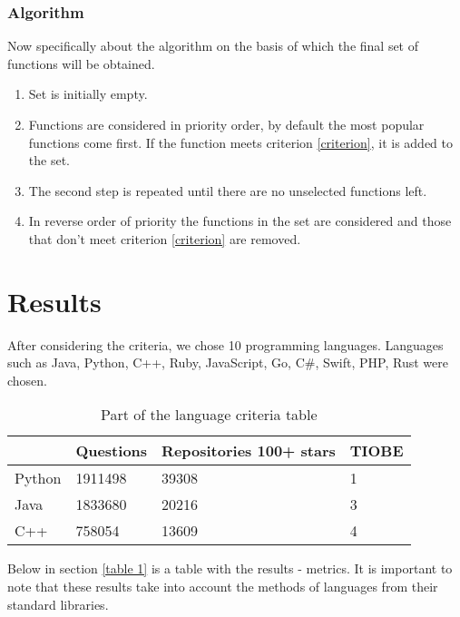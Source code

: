 \documentclass[anonymous,sigplan,review,11pt,nonacm,natbib=false]{acmart}
\begin{document}
    \subsubsection{Algorithm}

    Now specifically about the algorithm on the basis of which the final set of functions will be obtained.

    \begin{enumerate}
        \item Set is initially empty.
        \item Functions are considered in priority order, by default the most popular functions come first. If the function meets criterion \ref{criterion}, it is added to the set.
        \item The second step is repeated until there are no unselected functions left.
        \item In reverse order of priority the functions in the set are considered and those that don't meet criterion \ref{criterion} are removed.
    \end{enumerate}

    \section{Results}

    After considering the criteria, we chose 10 programming languages. Languages such as Java, Python, C++, Ruby, JavaScript, Go, C\#, Swift, PHP, Rust were chosen.


    \begin{table}[h]
        \begin{tabular}{llll}
            \hline
            & Questions
            & Repositories 100+ stars
            & TIOBE
            \\ \hline

            Python & 1911498 & 39308 & 1 \\

            Java & 1833680 & 20216 & 3 \\

            C++ & 758054 & 13609 & 4 \\ \hline
        \end{tabular}
        \caption{Part of the language criteria table}
    \end{table}

    Below in section \ref{table 1} is a table with the results - metrics. It is important to note that these results take into account the methods of languages from their standard libraries.
\end{document}
